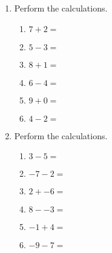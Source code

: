 \documentclass[12pt, twoside]{article}
\begin{document}
\begin{enumerate}
    \item Perform the calculations.
      \begin{multicols}{2}
        \begin{enumerate}[itemsep=0.75cm]
          \item $7 + 2 =$
          \item $5 - 3 =$
          \item $8 + 1 =$
          \item $6 - 4 =$
          \item $9 + 0 =$
          \item $4 - 2 =$
        \end{enumerate}
        \end{multicols} \vspace{0.25cm}

    \item Perform the calculations.
      \begin{multicols}{2}
        \begin{enumerate}[itemsep=0.75cm]
          \item $3 - 5 =$
          \item $-7 - 2 =$
          \item $2 + -6 =$
          \item $8 - -3 =$
          \item $-1 + 4 =$
          \item $-9 - 7 =$
        \end{enumerate}
        \end{multicols} 

\end{enumerate}
\end{document}
